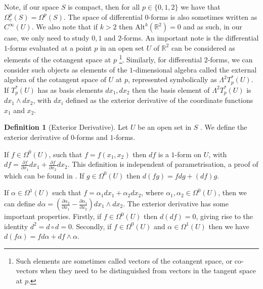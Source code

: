 \documentclass[11pt]{report}
\theoremstyle{definition}
\newtheorem{defn}[thm]{Definition}
\begin{document}
  Note, if our space $S$ is compact, then for all $p\in \{0,1,2\}$ we have that $\Omega_c^p(S) = \Omega^p(S)$. The space of differential $0$-forms is also sometimes written as $C^{\infty}(U)$. We also note that if $k > 2$ then $\text{Alt}^k(\mathbb{R}^2)=0$ and as such, in our case, we only need to study $0,1$ and $2$-forms. An important note is the differential $1$-forms evaluated at a point $p$ in an open set $U$ of $\mathbb{R}^2$ can be considered as elements of the cotangent space at $p$ \footnote{Such elements are sometimes called vectors of the cotangent space, or co-vectors when they need to be distinguished from vectors in the tangent space at $p$.}. Similarly, for differential $2$-forms, we can consider such objects as elements of the $1$-dimensional algebra called the external algebra of the cotangent space of $U$ at $p$, represented symbolically as $\Lambda^2T^*_p(U)$. If $T^*_p(U)$ has as basis elements $dx_1, dx_2$ then the basis element of $\Lambda^2T^*_p(U)$ is $dx_1\wedge dx_2$, with $dx_i$ defined as the exterior derivative of the coordinate functions $x_1$ and $x_2$. 
\begin{defn}[Exterior Derivative]\label{exteriorD}
  Let $U$ be an open set in $S$ . We define the exterior derivative of $0$-forms and $1$-forms.
  
  If $f \in \Omega^0(U)$, such that $f=f(x_1,x_2)$ then $df$ is a $1$-form on $U$, with $df = \frac{\partial f}{\partial x_1}dx_1 +  \frac{\partial f}{\partial x_2}dx_2$. This definition is independent of parametrisation, a proof of which can be found in \cite[p.69]{calcohomo}. If $g \in \Omega^0(U)$ then $d(fg) = fdg + (df)g$.

  If $\alpha \in \Omega^1(U)$ such that $f=\alpha_1 dx_1 + \alpha_2 dx_2$, where $\alpha_1, \alpha_2 \in \Omega^0(U)$, then we can define $d\alpha = \left(\frac{\partial \alpha_2}{\partial x_1} - \frac{\partial \alpha_1}{\partial x_2}\right) dx_1\wedge dx_2$. The exterior derivative has some important properties. Firstly, if $f \in \Omega^0(U)$ then $d(df) = 0$, giving rise to the identity $d^2 = d\circ d = 0$. Secondly, if $f \in \Omega^0(U)$ and $\alpha \in \Omega^1(U)$ then we have $d(f\alpha) = fd\alpha + df \wedge \alpha$. 
\end{defn}
\end{document}
